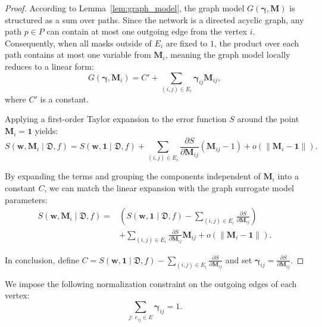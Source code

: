\begin{proof}
According to Lemma~\ref{lem:graph_model}, the graph model $G(\boldsymbol{\gamma}, \mathbf{M})$ is structured as a sum over paths. Since the network is a directed acyclic graph, any path $p \in P$ can contain at most one outgoing edge from the vertex $i$. Consequently, when all masks outside of $E_i$ are fixed to $1$, the product over each path contains at most one variable from $\mathbf{M}_i$, meaning the graph model locally reduces to a linear form:
\begin{equation}
G(\boldsymbol{\gamma}, \mathbf{M}_i) = C' + \sum_{(i,j) \in E_i} \boldsymbol{\gamma}_{ij} \mathbf{M}_{ij},
\end{equation}
where $C'$ is a constant.

Applying a first-order Taylor expansion to the error function $S$ around the point $\mathbf{M}_i = \mathbf{1}$ yields:
\begin{equation}
S(\mathbf{w}, \mathbf{M}_i \mid \mathfrak{D}, f) = S(\mathbf{w}, \mathbf{1} \mid \mathfrak{D}, f) + \sum_{(i,j) \in E_i} \frac{\partial S}{\partial \mathbf{M}_{ij}} (\mathbf{M}_{ij} - 1) + o(\|\mathbf{M}_i - \mathbf{1}\|).
\end{equation}

By expanding the terms and grouping the components independent of $\mathbf{M}_i$ into a constant $C$, we can match the linear expansion with the graph surrogate model parameters:
\begin{equation}
\begin{split}
S(\mathbf{w}, \mathbf{M}_i \mid \mathfrak{D}, f) =
&\left( S(\mathbf{w}, \mathbf{1} \mid \mathfrak{D}, f) - \sum_{(i,j) \in E_i} \frac{\partial S}{\partial \mathbf{M}_{ij}} \right)
\\
&+ \sum_{(i,j) \in E_i} \frac{\partial S}{\partial \mathbf{M}_{ij}} \mathbf{M}_{ij} + o(\|\mathbf{M}_i - \mathbf{1}\|).
\end{split}
\end{equation}

In conclusion, define $C = S(\mathbf{w}, \mathbf{1} \mid \mathfrak{D}, f) - \sum_{(i,j) \in E_i} \frac{\partial S}{\partial \mathbf{M}_{ij}}$ and set $\boldsymbol{\gamma}_{ij} = \frac{\partial S}{\partial \mathbf{M}_{ij}}$.
\end{proof}

\begin{proposition}
We impose the following normalization constraint on the outgoing edges of each vertex:
\begin{equation}
\sum_{j:\ e_{ij}\in E}\boldsymbol{\gamma}_{ij}=1.
\end{equation}
\end{proposition}

